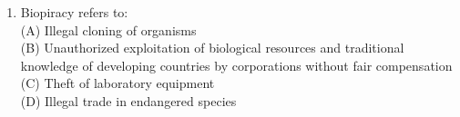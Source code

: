 \documentclass{article}
\begin{document}
\begin{enumerate}[label=Q\arabic*.]
\item Biopiracy refers to:
\\(A) Illegal cloning of organisms
\\(B) Unauthorized exploitation of biological resources and traditional knowledge of developing countries by corporations without fair compensation
\\(C) Theft of laboratory equipment
\\(D) Illegal trade in endangered species

\end{enumerate}
\end{document}
